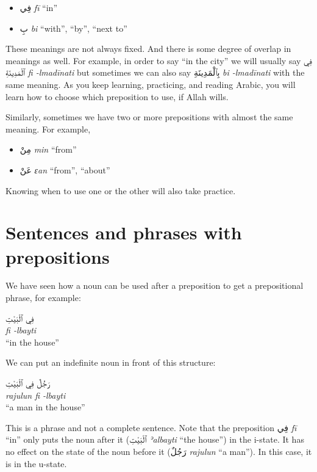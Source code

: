 \documentclass[
  10pt,
]{book}
\providecommand{\tightlist}{%
  \setlength{\itemsep}{0pt}\setlength{\parskip}{0pt}}
\begin{document}
\begin{itemize}
\tightlist
\item
  \foreignlanguage{arabic}{فِي} \emph{fī} \enquote{in}
\item
  \foreignlanguage{arabic}{بِ} \emph{bi} \enquote{with}, \enquote{by}, \enquote{next to}
\end{itemize}

These meanings are not always fixed. And there is some degree of overlap in meanings as well. For example, in order to say \enquote{in the city} we will usually say
\foreignlanguage{arabic}{فِي ٱلْمَدِينَةِ} \emph{fi -lmadīnati} but sometimes we can also say
\foreignlanguage{arabic}{بِٱلْمَدِينَةِ} \emph{bi -lmadīnati} with the same meaning. As you keep learning, practicing, and reading Arabic, you will learn how to choose which preposition to use, if Allah wills.

Similarly, sometimes we have two or more prepositions with almost the same meaning. For example,

\begin{itemize}
\tightlist
\item
  \foreignlanguage{arabic}{مِنْ} \emph{min} \enquote{from}
\item
  \foreignlanguage{arabic}{عَنْ} \emph{ɛan} \enquote{from}, \enquote{about}
\end{itemize}

Knowing when to use one or the other will also take practice.

\section{Sentences and phrases with prepositions}\label{sentences-and-phrases-with-prepositions}

We have seen how a noun can be used after a preposition to get a prepositional phrase, for example:

\foreignlanguage{arabic}{فِي ٱلْبَيْتِ}\\
\emph{fi -lbayti}\\
\enquote{in the house}

We can put an indefinite noun in front of this structure:

\foreignlanguage{arabic}{رَجُلٌ فِي ٱلْبَيْتِ}\\
\emph{rajulun fi -lbayti}\\
\enquote{a man in the house}

This is a phrase and not a complete sentence.
Note that the preposition \foreignlanguage{arabic}{فِي} \emph{fī} \enquote{in} only puts the noun after it (\foreignlanguage{arabic}{ٱلْبَيْتِ} \emph{ʾalbayti} \enquote{the house}) in the i-state. It has no effect on the state of the noun before it (\foreignlanguage{arabic}{رَجُلٌ} \emph{rajulun} \enquote{a man}). In this case, it is in the u-state.
\end{document}
